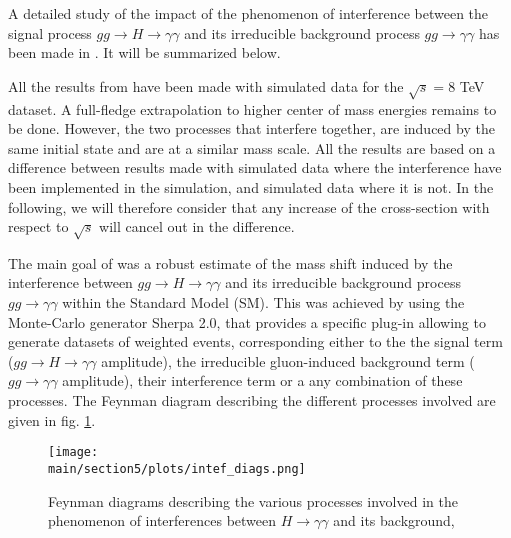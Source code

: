 A detailed study of the impact of the phenomenon of interference between the signal process $gg \rightarrow H \rightarrow \gamma\gamma$ and its irreducible background process $gg \rightarrow \gamma\gamma$ has been made in \cite{ATL-PHYS-PUB-2016-009}. It will be summarized below.

All the results from \cite{ATL-PHYS-PUB-2016-009} have been made with simulated data for the $\sqrt{s} = 8$ TeV dataset. A full-fledge extrapolation to higher center of mass energies remains to be done. However, the two processes that interfere together, are induced by the same initial state and are at a similar mass scale. All the results are based on a difference between results made with simulated data where the interference have been implemented in the simulation, and simulated data where it is not. In the following, we will therefore consider that any increase of the cross-section with respect to $\sqrt{s}$ will cancel out in the difference.

The main goal of \cite{ATL-PHYS-PUB-2016-009} was a robust estimate of the mass shift induced by the interference between $gg \rightarrow H \rightarrow \gamma\gamma$ and its irreducible background process $gg \rightarrow \gamma\gamma$ within the Standard Model (SM). This was achieved by using the Monte-Carlo generator Sherpa 2.0, that provides a specific plug-in allowing to generate datasets of weighted events, corresponding either to the the signal term ($gg \rightarrow H \rightarrow \gamma\gamma$ amplitude), the irreducible gluon-induced background term ($gg \rightarrow \gamma\gamma$ amplitude), their interference term or a any combination of these processes. The Feynman diagram describing the different processes involved are given in fig. \ref{fig:intef_diags}. 

\begin{figure}
    \centering
    \texttt{[image: \\main/section5/plots/intef\_diags.png]}
    \caption{Feynman diagrams describing the various processes involved in the phenomenon of interferences between $H\rightarrow\gamma\gamma$ and its background,}
    \label{fig:intef_diags}
\end{figure}

